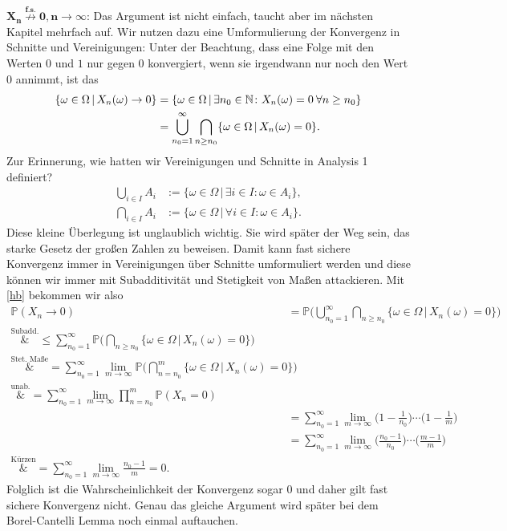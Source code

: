 \begin{beispiel}
	$\mathbf{X_n \overset{\text{f.s.}}{\not\longrightarrow}0, n \to \infty}$: Das Argument ist nicht einfach, taucht aber im n\"achsten Kapitel mehrfach auf. Wir nutzen dazu eine Umformulierung der Konvergenz in Schnitte und Vereinigungen: Unter der Beachtung, dass eine Folge mit den Werten $0$ und $1$ nur gegen $0$ konvergiert, wenn sie irgendwann nur noch den Wert $0$ annimmt, ist das
\begin{align}\label{hb}
\begin{split}
	\{ \omega\in \Omega\,|\, X_n(\omega) \to 0 \}&=\{ \omega\in \Omega \,|\, \exists n_0 \in \mathbb{N} \colon X_n(\omega)= 0 \: \forall n \geq n_0 \}\\
	&=\bigcup_{n_0 = 1}^{\infty} \bigcap_{n \geq n_0} \{ \omega\in \Omega\, |\, X_n(\omega) = 0 \}.
\end{split}
\end{align}		
Zur Erinnerung, wie hatten wir Vereinigungen und Schnitte in Analysis 1 definiert?
	\begin{align*}
		\bigcup_{i\in I} A_i&:=\{\omega \in \Omega\, |\, \exists i\in I : \omega \in A_i\},\\
		\bigcap_{i\in I} A_i&:=\{\omega \in \Omega\, |\, \forall i\in I :\omega \in A_i\}.
	\end{align*}
	Diese kleine \"Uberlegung ist unglaublich wichtig. Sie wird sp\"ater der Weg sein, das starke Gesetz der gro\ss en Zahlen zu beweisen. Damit kann fast sichere Konvergenz immer in Vereinigungen \"uber Schnitte umformuliert werden und diese k\"onnen wir immer mit Subadditivit\"at und Stetigkeit von Ma\ss en attackieren. Mit \eqref{hb} bekommen wir also
	\begin{align*}
		\mathbb{P}(X_n \to 0) &= \mathbb{P}\Big(\bigcup_{n_0 = 1}^{\infty} \bigcap_{n \geq n_0} \{ \omega\in \Omega \,|\, X_n(\omega) = 0 \}\Big)\\
		 \overset{\text{Subadd.}}&{\leq} \sum\limits_{n_0 = 1}^{\infty} \mathbb{P}\Big(\bigcap_{n \geq n_0} \{ \omega \in \Omega\,|\, X_n(\omega) = 0 \}\Big)\\
		 \overset{\text{Stet. Ma\ss e}}&{=}\sum\limits_{n_0 = 1}^{\infty} \lim_{m\to\infty}  \mathbb{P}\Big(\bigcap_{n = n_0}^m \{\omega\in \Omega\,|\, X_n(\omega) = 0 \}\Big)\\
		 \overset{\text{unab.}}&{=} \sum\limits_{n_0 = 1}^{\infty} \lim_{m\to\infty} \prod_{n=n_0}^m \mathbb{P}(X_n = 0)\\
		& = \sum\limits_{n_0 = 1}^{\infty} \lim_{m\to\infty}  \Big(1-\frac{1}{n_0}\Big)\cdots \Big(1-\frac{1}{m}\Big)\\
		& = \sum\limits_{n_0 = 1}^{\infty} \lim_{m\to\infty}  \Big(\frac{n_0-1}{n_0}\Big)\cdots \Big(\frac{m-1}{m}\Big)\\
		 \overset{\text{K\"urzen}}&{=} \sum\limits_{n_0 = 1}^{\infty} \lim_{m\to\infty}  \frac{n_0-1}{m}=0.
	\end{align*}
	Folglich ist die Wahrscheinlichkeit der Konvergenz sogar $0$ und daher gilt fast sichere Konvergenz nicht. Genau das gleiche Argument wird sp\"ater bei dem Borel-Cantelli Lemma noch einmal auftauchen.
\end{beispiel}
